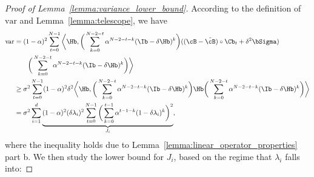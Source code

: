 \documentclass[11pt]{article}
\begin{document}
\begin{proof}[Proof of Lemma~\ref{lemma:variance_lower_bound}]
According to the definition of $\mathrm{var}$ and Lemma~\ref{lemma:telescope}, we have
\begin{align*}
\mathrm{var}&=(1-\alpha)^2\sum_{t=0}^{N-1}\bigg\langle\Hb, \bigg(\sum_{k=0}^{N-2-t}\alpha^{N-2-t-k}(\Ib-\delta\Hb)^k\bigg)((\cB-\tilde\cB)\circ\Cb_t+\delta^2\bSigma)\\
&\qquad\bigg(\sum_{k=0}^{N-2-t}\alpha^{N-2-t-k}(\Ib-\delta\Hb)^k\bigg)\bigg\rangle\\
&\ge\sigma^2\sum_{t=0}^{N-1}(1-\alpha)^2\delta^2\bigg\langle\Hb, \bigg(\sum_{k=0}^{N-2-t}\alpha^{N-2-t-k}(\Ib-\delta\Hb)^k\bigg)\Hb\bigg(\sum_{k=0}^{N-2-t}\alpha^{N-2-t-k}(\Ib-\delta\Hb)^k\bigg)\bigg\rangle\\
&=\sigma^2\sum_{i=1}^d\underbrace{(1-\alpha)^2(\delta\lambda_i)^2\sum_{t=0}^{N-1}\bigg(\sum_{k=0}^{t-1}\alpha^{t-1-k}(1-\delta\lambda_i)^k\bigg)^2}_{J_i},
\end{align*}
where the inequality holds due to Lemma~\ref{lemma:linear_operator_properties} part b. We then study the lower bound for $J_i$, based on the regime that $\lambda_i$ falls into:


\end{proof}
\end{document}
